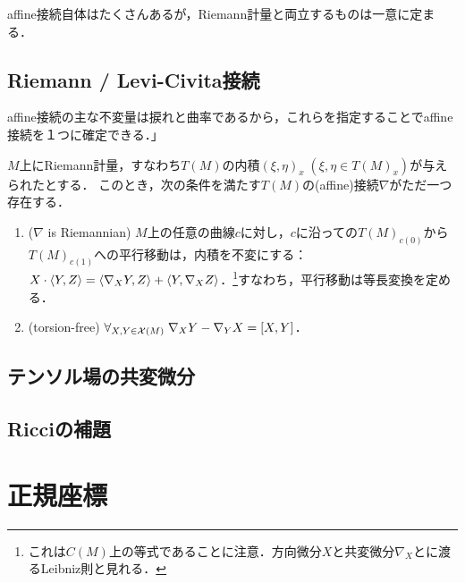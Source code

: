 \documentclass[uplatex,dvipdfmx]{jsreport}
\begin{document}
\begin{tcolorbox}[colframe=ForestGreen, colback=ForestGreen!10!white,breakable,colbacktitle=ForestGreen!40!white,coltitle=black,fonttitle=\bfseries\sffamily,
title=]
    affine接続自体はたくさんあるが，Riemann計量と両立するものは一意に定まる．
\end{tcolorbox}

\subsection{Riemann / Levi-Civita接続}

\begin{tcolorbox}[colframe=ForestGreen, colback=ForestGreen!10!white,breakable,colbacktitle=ForestGreen!40!white,coltitle=black,fonttitle=\bfseries\sffamily,
title=]
    affine接続の主な不変量は捩れと曲率であるから，これらを指定することでaffine接続を１つに確定できる．」
\end{tcolorbox}

\begin{theorem}
    $M$上にRiemann計量，すなわち$T(M)$の内積$(\xi,\eta)_x\;(\xi,\eta\in T(M)_x)$が与えられたとする．
    このとき，次の条件を満たす$T(M)$の(affine)接続$\nabla$がただ一つ存在する．
    \begin{enumerate}
        \item ($\nabla$ is Riemannian) $M$上の任意の曲線$c$に対し，$c$に沿っての$T(M)_{c(0)}$から$T(M)_{c(1)}$への平行移動は，内積を不変にする：$X\cdot\langle Y,Z\rangle=\langle\nabla_XY,Z\rangle+\langle Y,\nabla_XZ\rangle$．\footnote{これは$C(M)$上の等式であることに注意．方向微分$X$と共変微分$\nabla_X$とに渡るLeibniz則と見れる．}すなわち，平行移動は等長変換を定める．
        \item (torsion-free) $\forall_{X,Y\in\mathcal{X}(M)}\;\nabla_XY-\nabla_YX=[X,Y]$．
    \end{enumerate}
\end{theorem}

\subsection{テンソル場の共変微分}

\subsection{Ricciの補題}

\section{正規座標}
\end{document}

